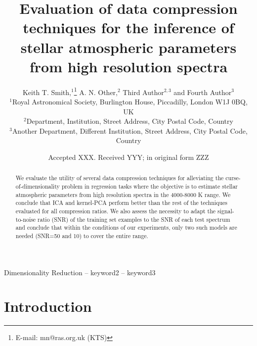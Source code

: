 \documentclass[a4paper,fleqn,usenatbib]{mnras}
\title[Short title, max. 45 characters]{Evaluation of data compression techniques for the inference of
  stellar atmospheric parameters from high resolution spectra}
\author[K. T. Smith et al.]{
Keith T. Smith,$^{1}$\thanks{E-mail: mn@ras.org.uk (KTS)}
A. N. Other,$^{2}$
Third Author$^{2,3}$
and Fourth Author$^{3}$
\\
$^{1}$Royal Astronomical Society, Burlington House, Piccadilly, London W1J 0BQ, UK\\
$^{2}$Department, Institution, Street Address, City Postal Code, Country\\
$^{3}$Another Department, Different Institution, Street Address, City Postal Code, Country
}
\date{Accepted XXX. Received YYY; in original form ZZZ}
\begin{document}
\label{firstpage}
\pagerange{\pageref{firstpage}--\pageref{lastpage}}
\maketitle

\begin{abstract}
We evaluate the utility of several data compression techniques
  for alleviating the curse-of-dimensionality problem in regression
  tasks where the objective is to estimate stellar atmospheric
  parameters from high resolution spectra in the 4000-8000 K range. We
  conclude that ICA and kernel-PCA perform better than the rest of the
  techniques evaluated for all compression ratios. We also assess the
  necessity to adapt the signal-to-noise ratio (SNR) of the training
  set examples to the SNR of each test spectrum and conclude that
  within the conditions of our experiments, only two such models are
  needed (SNR=50 and 10) to cover the entire range.
\end{abstract}

\begin{keywords}
Dimensionality Reduction -- keyword2 -- keyword3
\end{keywords}



\section{Introduction}
\end{document}

